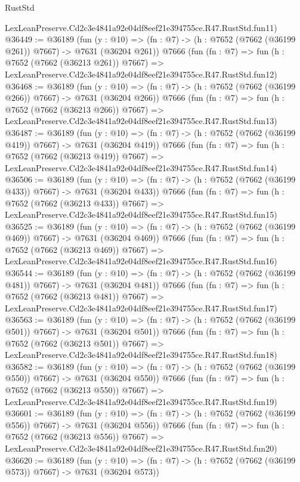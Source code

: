 \begin{lexlean}{RustStd}
\begin{coremodule}
    LexLeanPreserve.Cd2c3e4841a92e04df8eef21e394755ce.R47.RustStd.fun11)
@36449 := @36189
    (fun (y : @10) => (fn : @7) -> (h : @7652 (@7662 (@36199 @261)) @7667) -> @7631 (@36204 @261))
    @7666
    (fun (fn : @7) =>
    fun (h : @7652 (@7662 (@36213 @261)) @7667) =>
    LexLeanPreserve.Cd2c3e4841a92e04df8eef21e394755ce.R47.RustStd.fun12)
@36468 := @36189
    (fun (y : @10) => (fn : @7) -> (h : @7652 (@7662 (@36199 @266)) @7667) -> @7631 (@36204 @266))
    @7666
    (fun (fn : @7) =>
    fun (h : @7652 (@7662 (@36213 @266)) @7667) =>
    LexLeanPreserve.Cd2c3e4841a92e04df8eef21e394755ce.R47.RustStd.fun13)
@36487 := @36189
    (fun (y : @10) => (fn : @7) -> (h : @7652 (@7662 (@36199 @419)) @7667) -> @7631 (@36204 @419))
    @7666
    (fun (fn : @7) =>
    fun (h : @7652 (@7662 (@36213 @419)) @7667) =>
    LexLeanPreserve.Cd2c3e4841a92e04df8eef21e394755ce.R47.RustStd.fun14)
@36506 := @36189
    (fun (y : @10) => (fn : @7) -> (h : @7652 (@7662 (@36199 @433)) @7667) -> @7631 (@36204 @433))
    @7666
    (fun (fn : @7) =>
    fun (h : @7652 (@7662 (@36213 @433)) @7667) =>
    LexLeanPreserve.Cd2c3e4841a92e04df8eef21e394755ce.R47.RustStd.fun15)
@36525 := @36189
    (fun (y : @10) => (fn : @7) -> (h : @7652 (@7662 (@36199 @469)) @7667) -> @7631 (@36204 @469))
    @7666
    (fun (fn : @7) =>
    fun (h : @7652 (@7662 (@36213 @469)) @7667) =>
    LexLeanPreserve.Cd2c3e4841a92e04df8eef21e394755ce.R47.RustStd.fun16)
@36544 := @36189
    (fun (y : @10) => (fn : @7) -> (h : @7652 (@7662 (@36199 @481)) @7667) -> @7631 (@36204 @481))
    @7666
    (fun (fn : @7) =>
    fun (h : @7652 (@7662 (@36213 @481)) @7667) =>
    LexLeanPreserve.Cd2c3e4841a92e04df8eef21e394755ce.R47.RustStd.fun17)
@36563 := @36189
    (fun (y : @10) => (fn : @7) -> (h : @7652 (@7662 (@36199 @501)) @7667) -> @7631 (@36204 @501))
    @7666
    (fun (fn : @7) =>
    fun (h : @7652 (@7662 (@36213 @501)) @7667) =>
    LexLeanPreserve.Cd2c3e4841a92e04df8eef21e394755ce.R47.RustStd.fun18)
@36582 := @36189
    (fun (y : @10) => (fn : @7) -> (h : @7652 (@7662 (@36199 @550)) @7667) -> @7631 (@36204 @550))
    @7666
    (fun (fn : @7) =>
    fun (h : @7652 (@7662 (@36213 @550)) @7667) =>
    LexLeanPreserve.Cd2c3e4841a92e04df8eef21e394755ce.R47.RustStd.fun19)
@36601 := @36189
    (fun (y : @10) => (fn : @7) -> (h : @7652 (@7662 (@36199 @556)) @7667) -> @7631 (@36204 @556))
    @7666
    (fun (fn : @7) =>
    fun (h : @7652 (@7662 (@36213 @556)) @7667) =>
    LexLeanPreserve.Cd2c3e4841a92e04df8eef21e394755ce.R47.RustStd.fun20)
@36620 := @36189
    (fun (y : @10) => (fn : @7) -> (h : @7652 (@7662 (@36199 @573)) @7667) -> @7631 (@36204 @573))

\end{coremodule}
\end{lexlean}
